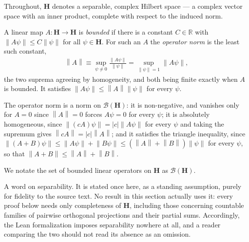 \begin{definition}
    \label{def:bounded-operator-notation}
    \leanok
    Throughout, $\mathbf{H}$ denotes a separable, complex Hilbert space — a complex vector space with an inner product, complete with respect to the induced norm.

    A linear map $A : \mathbf{H} \rightarrow \mathbf{H}$ is \textit{bounded} if there is a constant $C \in \mathbb{R}$ with $\left\| A\psi \right\| \le C \left\| \psi \right\|$ for all $\psi \in \mathbf{H}$. For such an $A$ the \textit{operator norm} is the least such constant,
    \begin{align}
        \left\| A \right\| \equiv \sup\limits_{\psi \ne 0} \frac{\left\| A\psi \right\|}{\left\| \psi \right\|} = \sup\limits_{\left\| \psi \right\| = 1} \left\| A\psi \right\|,
    \end{align}
    the two suprema agreeing by homogeneity, and both being finite exactly when $A$ is bounded. It satisfies $\left\| A\psi \right\| \le \left\| A \right\| \left\| \psi \right\|$ for every $\psi$.

    The operator norm is a norm on $\mathcal{B}(\mathbf{H})$: it is non-negative, and vanishes only for $A = 0$ since $\left\| A \right\| = 0$ forces $A\psi = 0$ for every $\psi$; it is absolutely homogeneous, since $\left\| (cA)\psi \right\| = \lvert c \rvert \left\| A\psi \right\|$ for every $\psi$ and taking the supremum gives $\left\| cA \right\| = \lvert c \rvert \left\| A \right\|$; and it satisfies the triangle inequality, since $\left\| (A+B)\psi \right\| \le \left\| A\psi \right\| + \left\| B\psi \right\| \le \left( \left\| A \right\| + \left\| B \right\| \right) \left\| \psi \right\|$ for every $\psi$, so that $\left\| A + B \right\| \le \left\| A \right\| + \left\| B \right\|$.

    We notate the set of bounded linear operators on $\mathbf{H}$ as $\mathcal{B}(\mathbf{H})$.

    A word on separability. It is stated once here, as a standing assumption, purely for fidelity to the source text. No result in this section actually uses it: every proof below needs only completeness of $\mathbf{H}$, including those concerning countable families of pairwise orthogonal projections and their partial sums. Accordingly, the Lean formalization imposes separability nowhere at all, and a reader comparing the two should not read its absence as an omission.
\end{definition}

